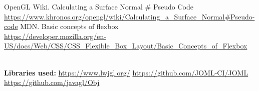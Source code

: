 \documentclass{article}
\begin{document}
\begin{thebibliography}{9}
         OpenGL Wiki. Calculating a Surface Normal \# Pseudo Code \\
        \url{https://www.khronos.org/opengl/wiki/Calculating_a_Surface_Normal#Pseudo-code}
         MDN. Basic concepts of flexbox \\
        \url{https://developer.mozilla.org/en-US/docs/Web/CSS/CSS_Flexible_Box_Layout/Basic_Concepts_of_Flexbox}

        \textbf{\\ Libraries used:}
         \url{https://www.lwjgl.org/}
         \url{https://github.com/JOML-CI/JOML}
         \url{https://github.com/javagl/Obj}


\end{thebibliography}
\end{document}
